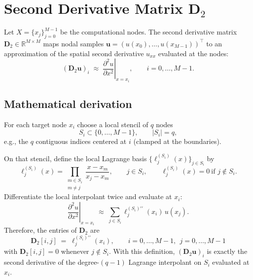 \clearpage


\section{Second Derivative Matrix \texorpdfstring{$\mathbf{D}_2$}{D2}}
\label{sec:second_derivative_matrix_D2}

Let \(X=\{x_j\}_{j=0}^{M-1}\) be the computational nodes. The second derivative
matrix \(\mathbf{D}_2 \in \mathbb{R}^{M\times M}\) maps nodal samples
\(\mathbf{u}=(u(x_0),\dots,u(x_{M-1}))^\top\) to an approximation of the spatial
second derivative \(u_{xx}\) evaluated at the nodes:
\begin{equation}
(\mathbf{D}_2\mathbf{u})_i \;\approx\; \left.\frac{\partial^2 u}{\partial x^2}\right|_{x=x_i},
\qquad i=0,\dots,M-1.
\end{equation}

\subsection*{Mathematical derivation}
For each target node \(x_i\) choose a local stencil of \(q\) nodes
\[
S_i \subset \{0,\dots,M-1\}, \qquad |S_i|=q,
\]
e.g., the \(q\) contiguous indices centered at \(i\) (clamped at the boundaries).


On that stencil, define the local Lagrange basis \(\{\ell^{(S_i)}_j(x)\}_{j\in S_i}\) by
\begin{equation}
\ell^{(S_i)}_j(x)
=
\prod_{\substack{m \in S_i\\ m\neq j}}
\frac{x - x_m}{x_j - x_m},
\qquad j\in S_i,
\qquad
\ell^{(S_i)}_j(x)=0 \ \text{if } j\notin S_i.
\end{equation}
Differentiate the local interpolant twice and evaluate at \(x_i\):
\begin{equation}
\left.\frac{\partial^2 u}{\partial x^2}\right|_{x=x_i}
\;\approx\;
\sum_{j\in S_i} \ell^{(S_i)\prime\prime}_j(x_i)\,u(x_j).
\end{equation}
Therefore, the entries of \(\mathbf{D}_2\) are
\begin{equation}
\boxed{\;
\mathbf{D}_2[i,j] \;=\; \ell^{(S_i)\prime\prime}_j(x_i),
\qquad i=0,\dots,M-1,\ \ j=0,\dots,M-1
\;}
\label{eq:D2_definition}
\end{equation}
with \(\mathbf{D}_2[i,j]=0\) whenever \(j\notin S_i\). With this definition,
\((\mathbf{D}_2\mathbf{u})_i\) is exactly the second derivative of the degree-\((q-1)\)
Lagrange interpolant on \(S_i\) evaluated at \(x_i\).

